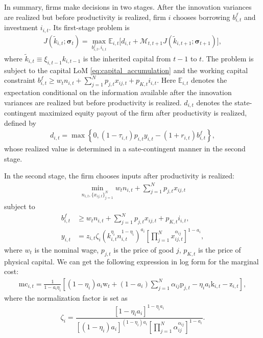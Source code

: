 \documentclass[12pt]{article}
\numberwithin{equation}{section}
\begin{document}
In summary, firms make decisions in two stages. After the innovation variances are realized but before productivity is realized, firm $i$ chooses borrowing $b^f_{i,t}$ and investment $i_{i,t}$. Its first-stage problem is
\begin{align}\label{eq:firm_first_stage_decision}
    J
    \left(\tilde{k}_{i,t}; \boldsymbol\sigma_t\right)
    =
    \max_{b^f_{i,t}, i_{i,t}}
    \mathbb{E}_{i,t}
    \Bigg[
            d_{i,t}
            +
            \mathcal{M}_{t,t+1}
            J\left(\tilde{k}_{i,t+1}; \boldsymbol\sigma_{t+1}\right)
    \Bigg],
\end{align}
where $\tilde{k}_{i,t} \equiv \xi_{i,t-1}k_{i,t-1}$ is the inherited capital from $t-1$ to $t$. The problem is subject to the capital LoM \eqref{eq:capital_accumulation} and the working capital constraint $b^f_{i,t} \geq w_t n_{i,t} + \sum_{j=1}^{N} p_{j,t} x_{ij,t} + p_{K,t} i_{i,t}$. Here $\mathbb{E}_{i,t}$ denotes the expectation conditional on the information available after the innovation variances are realized but before productivity is realized. $d_{i,t}$ denotes the state-contingent maximized equity payout of the firm after productivity is realized, defined by
\begin{align*}
    d_{i,t}
    =
    \max\left\{
        0,
        (1-\tau_{i,t})p_{i,t} y_{i,t}
        -
        (1+r_{i,t})b^f_{i,t}
    \right\},
\end{align*}
whose realized value is determined in a sate-contingent manner in the second stage.

In the second stage, the firm chooses inputs after productivity is realized:
\begin{align}\label{eq:firm_second_stage_decision}
    \min_{n_{i,t},\{x_{ij,t}\}_{j=1}^{N}}
    w_t n_{i,t}
    + \sum_{j=1}^{N} p_{j,t} x_{ij,t}
\end{align}
subject to
\begin{align*}
    b^f_{i,t} &\geq w_t n_{i,t}
    + \sum_{j=1}^{N} p_{j,t} x_{ij,t}
    + p_{K,t} i_{i,t},
    \\
    y_{i,t}
    &=
    z_{i,t}\zeta_i
    \left(
        k_{i,t}^{\eta_i}n_{i,t}^{1-\eta_i}
    \right)^{a_i}
    \left[
        \prod_{j=1}^{N}
        x_{ij,t}^{\alpha_{ij}}
    \right]^{1-a_i},
\end{align*}
where $w_t$ is the nominal wage, $p_{j,t}$ is the price of good $j$, $p_{K,t}$ is the price of physical capital. We can get the following expression in log form for the marginal cost:
\begin{align}\label{eq:marginal_cost}
    \text{mc}_{i,t} = \frac{1}{1-a_i\eta_i} \left[(1-\eta_i)a_i \text{w}_t + (1-a_i)\sum_{j=1}^N \alpha_{ij} \text{p}_{j,t} - \eta_i a_i \text{k}_{i,t} - \text{z}_{i,t}\right],
\end{align}
where the normalization factor is set as
\begin{align*}
    \zeta_i = \dfrac{[1-\eta_i a_i]^{1-\eta_i a_i}}{[(1-\eta_i)a_i]^{(1-\eta_i)a_i}\left[\prod_{j=1}^N \alpha_{ij}^{\alpha_{ij}}\right]^{1-a_i}}.
\end{align*}
\end{document}
